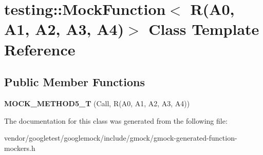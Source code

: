 \hypertarget{classtesting_1_1MockFunction_3_01R_07A0_00_01A1_00_01A2_00_01A3_00_01A4_08_4}{}\section{testing\+:\+:Mock\+Function$<$ R(A0, A1, A2, A3, A4)$>$ Class Template Reference}
\label{classtesting_1_1MockFunction_3_01R_07A0_00_01A1_00_01A2_00_01A3_00_01A4_08_4}
\subsection*{Public Member Functions}
\begin{DoxyCompactItemize}
\item 
{\bfseries M\+O\+C\+K\+\_\+\+M\+E\+T\+H\+O\+D5\+\_\+T} (Call, R(A0, A1, A2, A3, A4))\hypertarget{classtesting_1_1MockFunction_3_01R_07A0_00_01A1_00_01A2_00_01A3_00_01A4_08_4_a572318905fea75f71338c120f7d1833d}{}\label{classtesting_1_1MockFunction_3_01R_07A0_00_01A1_00_01A2_00_01A3_00_01A4_08_4_a572318905fea75f71338c120f7d1833d}

\end{DoxyCompactItemize}


The documentation for this class was generated from the following file\+:\begin{DoxyCompactItemize}
\item 
vendor/googletest/googlemock/include/gmock/gmock-\/generated-\/function-\/mockers.\+h\end{DoxyCompactItemize}
